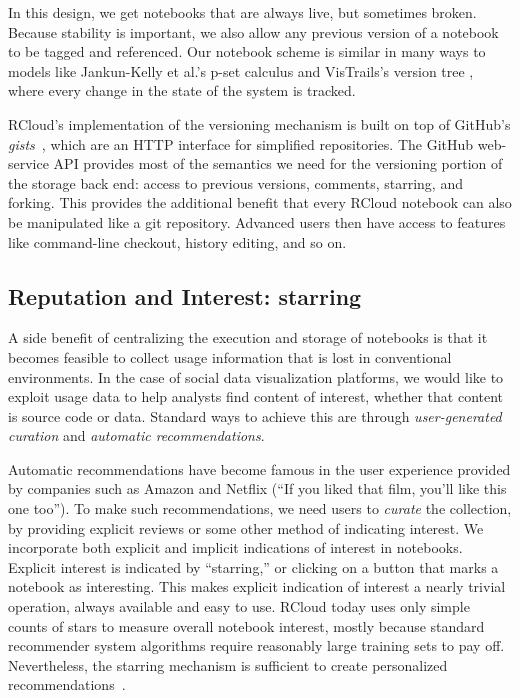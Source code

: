 In this design, we get notebooks that are always live,
but sometimes broken. Because stability is important, we also
allow any previous version of a notebook to be tagged and referenced.
Our notebook scheme is similar in many ways to models like
Jankun-Kelly et al.'s p-set calculus
\cite{Jankun-Kelly:2007:MFV} and VisTrails's version tree
\cite{Callahan:2006:VVM}, where every change in the state of the
system is tracked.

RCloud's implementation of the versioning mechanism is built on
top of GitHub's \emph{gists}~\cite{GitHub:2014:GG}, which are an HTTP
interface for simplified repositories. The GitHub web-service API
provides most of the semantics we need for the versioning portion of
the storage back end: access to previous versions, comments, starring,
and forking. This provides the additional benefit that every RCloud
notebook can also be manipulated like a git repository. Advanced users
then have access to features like command-line checkout, history
editing, and so on.

\subsection{Reputation and Interest: starring\label{sec:starring}}

A side benefit of centralizing the execution and storage of
notebooks is that it becomes feasible to collect usage information
that is lost in conventional environments.
In the case of social data visualization
platforms, we would like to exploit usage data to help analysts
find content of interest, whether that content is source code
or data. Standard ways to achieve this are through
\emph{user-generated curation} and \emph{automatic recommendations}.

Automatic recommendations have become famous in the user experience
provided by companies such as Amazon and Netflix (``If you liked
that film, you'll like this one too''). To make such
recommendations, we need users to \emph{curate} the collection, by
providing explicit reviews or some other method of indicating interest.
We incorporate both explicit and implicit indications of interest
in notebooks. Explicit interest is indicated by ``starring,'' or
clicking on a button that marks a notebook as interesting.
This makes explicit indication of interest a nearly trivial operation,
always available and easy to use.
%
RCloud today uses only simple counts of stars to measure overall
notebook interest, mostly because standard
recommender system algorithms 
require reasonably large training sets to pay off.
Nevertheless, the starring mechanism is sufficient
to create personalized recommendations~\cite{Hu:2008:CFF}.

